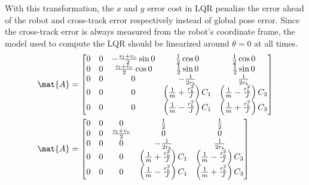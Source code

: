 With this transformation, the $x$ and $y$ error cost in LQR penalize the error
ahead of the robot and cross-track error respectively instead of global pose
error. Since the cross-track error is always measured from the robot's
coordinate frame, the \gls{model} used to compute the LQR should be linearized
around $\theta = 0$ at all times.
\begin{align*}
  \mat{A} &=
  \begin{bmatrix}
    0 & 0 & -\frac{v_l + v_r}{2}\sin 0 & \frac{1}{2}\cos 0 &
      \frac{1}{2}\cos 0 \\
    0 & 0 & \frac{v_l + v_r}{2}\cos 0 & \frac{1}{2}\sin 0 &
      \frac{1}{2}\sin 0 \\
    0 & 0 & 0 & -\frac{1}{2r_b} & \frac{1}{2r_b} \\
    0 & 0 & 0 & \left(\frac{1}{m} + \frac{r_b^2}{J}\right) C_1 &
      \left(\frac{1}{m} - \frac{r_b^2}{J}\right) C_3 \\
    0 & 0 & 0 & \left(\frac{1}{m} - \frac{r_b^2}{J}\right) C_1 &
      \left(\frac{1}{m} + \frac{r_b^2}{J}\right) C_3
  \end{bmatrix} \\
  \mat{A} &=
  \begin{bmatrix}
    0 & 0 & 0 & \frac{1}{2} & \frac{1}{2} \\
    0 & 0 & \frac{v_l + v_r}{2} & 0 & 0 \\
    0 & 0 & 0 & -\frac{1}{2r_b} & \frac{1}{2r_b} \\
    0 & 0 & 0 & \left(\frac{1}{m} + \frac{r_b^2}{J}\right) C_1 &
      \left(\frac{1}{m} - \frac{r_b^2}{J}\right) C_3 \\
    0 & 0 & 0 & \left(\frac{1}{m} - \frac{r_b^2}{J}\right) C_1 &
      \left(\frac{1}{m} + \frac{r_b^2}{J}\right) C_3
  \end{bmatrix}
\end{align*}
